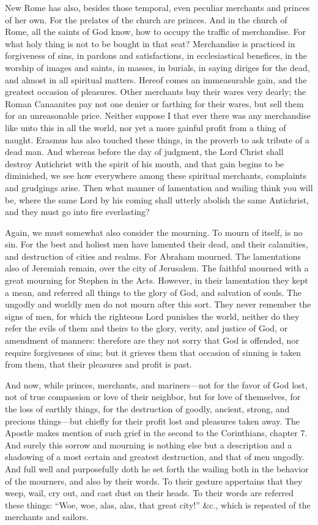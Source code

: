 New Rome has also, besides those temporal, even peculiar merchants and princes of her own. For the prelates of the church are princes. And in the church of Rome, all the saints of God know, how to occupy the traffic of merchandise. For what holy thing is not to be bought in that seat? Merchandise is practiced in forgiveness of sins, in pardons and satisfactions, in ecclesiastical benefices, in the worship of images and saints, in masses, in burials, in saying diriges for the dead, and almost in all spiritual matters. Hereof comes an immeasurable gain, and the greatest occasion of pleasures. Other merchants buy their wares very dearly; the Roman Canaanites pay not one denier or farthing for their wares, but sell them for an unreasonable price. Neither suppose I that ever there was any merchandise like unto this in all the world, nor yet a more gainful profit from a thing of naught. Erasmus has also touched these things, in the proverb to ask tribute of a dead man. And whereas before the day of judgment, the Lord Christ shall destroy Antichrist with the spirit of his mouth, and that gain begins to be diminished, we see how everywhere among these spiritual merchants, complaints and grudgings arise. Then what manner of lamentation and wailing think you will be, where the same Lord by his coming shall utterly abolish the same Antichrist, and they must go into fire everlasting?

Again, we must somewhat also consider the mourning. To mourn of itself, is no sin. For the best and holiest men have lamented their dead, and their calamities, and destruction of cities and realms. For Abraham mourned. The lamentations also of Jeremiah remain, over the city of Jerusalem. The faithful mourned with a great mourning for Stephen in the Acts. However, in their lamentation they kept a mean, and referred all things to the glory of God, and salvation of souls. The ungodly and worldly men do not mourn after this sort. They never remember the signs of men, for which the righteous Lord punishes the world, neither do they refer the evils of them and theirs to the glory, verity, and justice of God, or amendment of manners: therefore are they not sorry that God is offended, nor require forgiveness of sins; but it grieves them that occasion of sinning is taken from them, that their pleasures and profit is past.

And now, while princes, merchants, and mariners—not for the favor of God lost, not of true compassion or love of their neighbor, but for love of themselves, for the loss of earthly things, for the destruction of goodly, ancient, strong, and precious things—but chiefly for their profit lost and pleasures taken away. The Apostle makes mention of such grief in the second to the Corinthians, chapter 7. And surely this sorrow and mourning is nothing else but a description and a shadowing of a most certain and greatest destruction, and that of men ungodly. And full well and purposefully doth he set forth the wailing both in the behavior of the mourners, and also by their words. To their gesture appertains that they weep, wail, cry out, and cast dust on their heads. To their words are referred these things: “Woe, woe, alas, alas, that great city!” \&c., which is repeated of the merchants and sailors.

